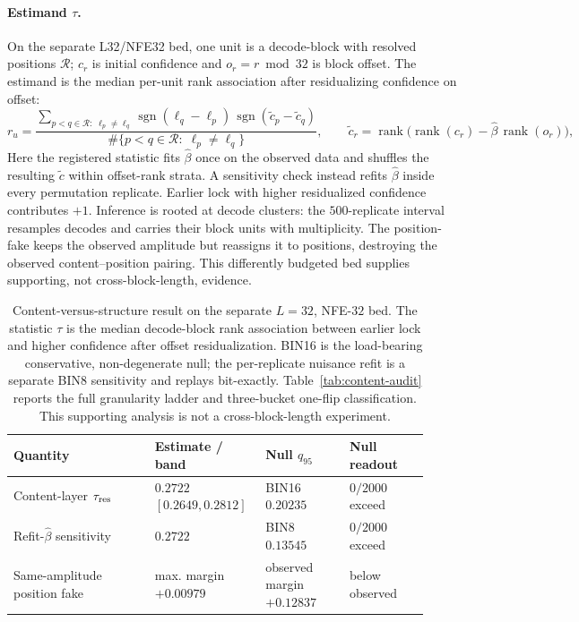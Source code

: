 \documentclass{article}
\begin{document}
\paragraph{Estimand $\tau$.}
On the separate L32/NFE32 bed, one unit is a decode-block with resolved positions
$\mathcal R$; $c_r$ is initial confidence and $o_r=r\bmod32$ is block offset.
The estimand is the median per-unit rank association after residualizing confidence
on offset:
\begin{equation}
r_u=\frac{\sum_{p<q\in\mathcal R:\;\ell_p\ne\ell_q}
\operatorname{sgn}(\ell_q-\ell_p)\,\operatorname{sgn}(\tilde c_p-\tilde c_q)}
{\#\{p<q\in\mathcal R:\;\ell_p\ne\ell_q\}},
\qquad
\tilde c_r=\operatorname{rank}\!\big(\operatorname{rank}(c_r)-\hat\beta\,\operatorname{rank}(o_r)\big),
\label{eq:tau}
\end{equation}
Here the registered statistic fits $\hat\beta$ once on the observed data and
shuffles the resulting $\tilde c$ within offset-rank strata. A sensitivity check
instead refits $\hat\beta$ inside every permutation replicate. Earlier lock with
higher residualized confidence contributes $+1$.
Inference is rooted at decode clusters: the $500$-replicate interval resamples
decodes and carries their block units with multiplicity. The position-fake keeps
the observed amplitude but reassigns it to positions, destroying the observed
content--position pairing. This differently budgeted bed supplies supporting,
not cross-block-length, evidence.

\begin{table}[H]
\centering
\small
\setlength{\tabcolsep}{4pt}
\begin{tabular}{@{}>{\raggedright\arraybackslash}p{0.32\linewidth}
                    >{\raggedright\arraybackslash}p{0.23\linewidth}
                    >{\raggedright\arraybackslash}p{0.19\linewidth}
                    >{\raggedright\arraybackslash}p{0.18\linewidth}@{}}
\toprule
Quantity & Estimate / band & Null $q_{95}$ & Null readout \\
\midrule
Content-layer $\tau_{\rm res}$ & $0.2722$ $[0.2649,0.2812]$ & BIN16 $0.20235$ & $0/2000$ exceed \\
Refit-$\hat\beta$ sensitivity & $0.2722$ & BIN8 $0.13545$ & $0/2000$ exceed \\
Same-amplitude position fake & max. margin $+0.00979$ & observed margin $+0.12837$ & below observed \\
\bottomrule
\end{tabular}
\caption{Content-versus-structure result on the separate $L=32$, NFE-$32$
bed. The statistic $\tau$ is the median decode-block rank association between
earlier lock and higher confidence after offset residualization. BIN16 is the
load-bearing conservative, non-degenerate null; the per-replicate nuisance refit
is a separate BIN8 sensitivity and replays bit-exactly. Table~\ref{tab:content-audit}
reports the full granularity ladder and three-bucket one-flip classification.
This supporting analysis is not a cross-block-length experiment.}
\label{tab:content}
\end{table}
\end{document}
